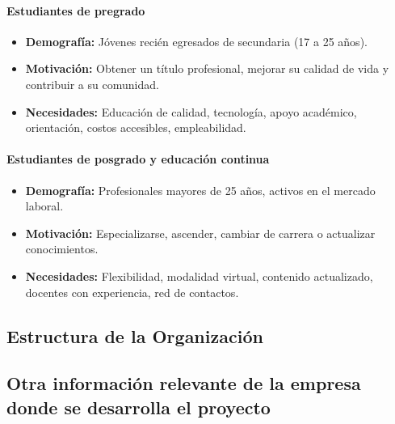 \paragraph{Estudiantes de pregrado}
\begin{itemize}
	\item \textbf{Demografía:} Jóvenes recién egresados de secundaria (17 a 25 años).
	\item \textbf{Motivación:} Obtener un título profesional, mejorar su calidad de vida y contribuir a su comunidad.
	\item \textbf{Necesidades:} Educación de calidad, tecnología, apoyo académico, orientación, costos accesibles, empleabilidad.
\end{itemize}

\paragraph{Estudiantes de posgrado y educación continua}
\begin{itemize}
	\item \textbf{Demografía:} Profesionales mayores de 25 años, activos en el mercado laboral.
	\item \textbf{Motivación:} Especializarse, ascender, cambiar de carrera o actualizar conocimientos.
	\item \textbf{Necesidades:} Flexibilidad, modalidad virtual, contenido actualizado, docentes con experiencia, red de contactos.
\end{itemize}

\subsection{Estructura de la Organización}
\subsection{Otra información relevante de la empresa donde se desarrolla el proyecto}

